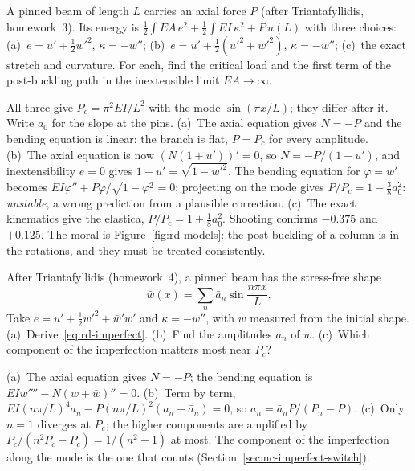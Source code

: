 \label{exo:rd-kinematics}
%
A pinned beam of length $L$ carries an axial force $P$ (after Triantafyllidis, homework~3). Its
energy is $\displaystyle\frac12\int EA\,e^2 + \frac12\int EI\,\kappa^2 + P\,u(L)$ with three choices: (a)~$e = u' + \tfrac12w'^2$,
$\kappa = -w''$; (b)~$e = u' + \tfrac12(u'^2 + w'^2)$, $\kappa = -w''$; (c)~the exact stretch and curvature.
For each, find the critical load and the first term of the post-buckling path in the
inextensible limit $EA \to \infty$.
\begin{solution}
All three give $P_c = \pi^2EI/L^2$ with the mode $\sin(\pi x/L)$; they differ after it. Write $a_0$ for
the slope at the pins. (a)~The axial equation gives $N = -P$ and the bending equation is linear: the
branch is flat, $P = P_c$ for every amplitude. (b)~The axial equation is now $(N(1 + u'))' = 0$, so
$N = -P/(1 + u')$, and inextensibility $e = 0$ gives $1 + u' = \sqrt{1 - w'^2}$. The bending equation
for $\varphi = w'$ becomes $EI\varphi'' + P\varphi/\sqrt{1 - \varphi^2} = 0$; projecting on the mode gives
$P/P_c = 1 - \tfrac38 a_0^2$: \emph{unstable}, a wrong prediction from a plausible correction.
(c)~The exact kinematics give the elastica, $P/P_c = 1 + \tfrac18 a_0^2$. Shooting confirms
$-0.375$ and $+0.125$. The moral is Figure~\ref{fig:rd-models}: the post-buckling of a column is
in the rotations, and they must be treated consistently.

\end{solution}

\label{exo:rd-wavy}
%
After Triantafyllidis (homework~4), a pinned beam has the stress-free shape
\[
  \bar w(x) = \sum_n \bar a_n\sin\frac{n\pi x}{L} .
\]
Take $e = u' + \tfrac12 w'^2 + \bar w'w'$ and $\kappa = -w''$, with $w$ measured from the
initial shape. (a)~Derive~\eqref{eq:rd-imperfect}. (b)~Find the amplitudes $a_n$ of $w$. (c)~Which
component of the imperfection matters most near $P_c$?
\begin{solution}
(a)~The axial equation gives $N = -P$; the bending equation is $EIw'''' - N(w + \bar w)'' = 0$.
(b)~Term by term, $EI(n\pi/L)^4a_n - P(n\pi/L)^2(a_n + \bar a_n) = 0$, so $a_n = \bar a_nP/(P_n - P)$.
(c)~Only $n = 1$ diverges at $P_c$; the higher components are amplified by $P_c/(n^2P_c - P_c)
= 1/(n^2 - 1)$ at most. The component of the imperfection along the mode is the one that counts
(Section~\ref{sec:nc-imperfect-switch}).
\end{solution}

